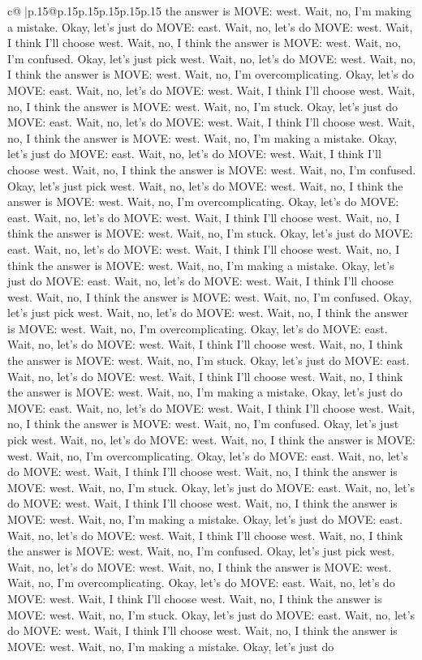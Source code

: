 \documentclass{article}
\begin{document}
{\begin{supertabular}{c@{$\;$}|p{.15\linewidth}@{}p{.15\linewidth}p{.15\linewidth}p{.15\linewidth}p{.15\linewidth}p{.15\linewidth}}
{{{the answer is MOVE: west. Wait, no, I'm making a mistake. Okay, let's just do MOVE: east. Wait, no, let's do MOVE: west. Wait, I think I'll choose west. Wait, no, I think the answer is MOVE: west. Wait, no, I'm confused. Okay, let's just pick west. Wait, no, let's do MOVE: west. Wait, no, I think the answer is MOVE: west. Wait, no, I'm overcomplicating. Okay, let's do MOVE: east. Wait, no, let's do MOVE: west. Wait, I think I'll choose west. Wait, no, I think the answer is MOVE: west. Wait, no, I'm stuck. Okay, let's just do MOVE: east. Wait, no, let's do MOVE: west. Wait, I think I'll choose west. Wait, no, I think the answer is MOVE: west. Wait, no, I'm making a mistake. Okay, let's just do MOVE: east. Wait, no, let's do MOVE: west. Wait, I think I'll choose west. Wait, no, I think the answer is MOVE: west. Wait, no, I'm confused. Okay, let's just pick west. Wait, no, let's do MOVE: west. Wait, no, I think the answer is MOVE: west. Wait, no, I'm overcomplicating. Okay, let's do MOVE: east. Wait, no, let's do MOVE: west. Wait, I think I'll choose west. Wait, no, I think the answer is MOVE: west. Wait, no, I'm stuck. Okay, let's just do MOVE: east. Wait, no, let's do MOVE: west. Wait, I think I'll choose west. Wait, no, I think the answer is MOVE: west. Wait, no, I'm making a mistake. Okay, let's just do MOVE: east. Wait, no, let's do MOVE: west. Wait, I think I'll choose west. Wait, no, I think the answer is MOVE: west. Wait, no, I'm confused. Okay, let's just pick west. Wait, no, let's do MOVE: west. Wait, no, I think the answer is MOVE: west. Wait, no, I'm overcomplicating. Okay, let's do MOVE: east. Wait, no, let's do MOVE: west. Wait, I think I'll choose west. Wait, no, I think the answer is MOVE: west. Wait, no, I'm stuck. Okay, let's just do MOVE: east. Wait, no, let's do MOVE: west. Wait, I think I'll choose west. Wait, no, I think the answer is MOVE: west. Wait, no, I'm making a mistake. Okay, let's just do MOVE: east. Wait, no, let's do MOVE: west. Wait, I think I'll choose west. Wait, no, I think the answer is MOVE: west. Wait, no, I'm confused. Okay, let's just pick west. Wait, no, let's do MOVE: west. Wait, no, I think the answer is MOVE: west. Wait, no, I'm overcomplicating. Okay, let's do MOVE: east. Wait, no, let's do MOVE: west. Wait, I think I'll choose west. Wait, no, I think the answer is MOVE: west. Wait, no, I'm stuck. Okay, let's just do MOVE: east. Wait, no, let's do MOVE: west. Wait, I think I'll choose west. Wait, no, I think the answer is MOVE: west. Wait, no, I'm making a mistake. Okay, let's just do MOVE: east. Wait, no, let's do MOVE: west. Wait, I think I'll choose west. Wait, no, I think the answer is MOVE: west. Wait, no, I'm confused. Okay, let's just pick west. Wait, no, let's do MOVE: west. Wait, no, I think the answer is MOVE: west. Wait, no, I'm overcomplicating. Okay, let's do MOVE: east. Wait, no, let's do MOVE: west. Wait, I think I'll choose west. Wait, no, I think the answer is MOVE: west. Wait, no, I'm stuck. Okay, let's just do MOVE: east. Wait, no, let's do MOVE: west. Wait, I think I'll choose west. Wait, no, I think the answer is MOVE: west. Wait, no, I'm making a mistake. Okay, let's just do }}}
\end{supertabular}}
\end{document}
